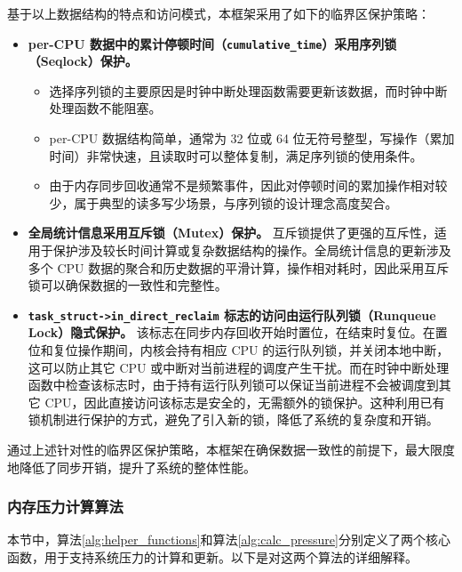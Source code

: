 基于以上数据结构的特点和访问模式，本框架采用了如下的临界区保护策略：

\begin{itemize}
    \item \textbf{per-CPU 数据中的累计停顿时间（\texttt{cumulative\_time}）采用序列锁（Seqlock）保护。}
    \begin{itemize}
        \item 选择序列锁的主要原因是时钟中断处理函数需要更新该数据，而时钟中断处理函数不能阻塞。
        \item per-CPU 数据结构简单，通常为 32 位或 64 位无符号整型，写操作（累加时间）非常快速，且读取时可以整体复制，满足序列锁的使用条件。
        \item 由于内存同步回收通常不是频繁事件，因此对停顿时间的累加操作相对较少，属于典型的读多写少场景，与序列锁的设计理念高度契合。
    \end{itemize}

    \item \textbf{全局统计信息采用互斥锁（Mutex）保护。} 互斥锁提供了更强的互斥性，适用于保护涉及较长时间计算或复杂数据结构的操作。全局统计信息的更新涉及多个 CPU 数据的聚合和历史数据的平滑计算，操作相对耗时，因此采用互斥锁可以确保数据的一致性和完整性。

    \item \textbf{\texttt{task\_struct->in\_direct\_reclaim} 标志的访问由运行队列锁（Runqueue Lock）隐式保护。}
    该标志在同步内存回收开始时置位，在结束时复位。在置位和复位操作期间，内核会持有相应 CPU 的运行队列锁，并关闭本地中断，这可以防止其它 CPU 或中断对当前进程的调度产生干扰。而在时钟中断处理函数中检查该标志时，由于持有运行队列锁可以保证当前进程不会被调度到其它 CPU，因此直接访问该标志是安全的，无需额外的锁保护。这种利用已有锁机制进行保护的方式，避免了引入新的锁，降低了系统的复杂度和开销。
\end{itemize}

通过上述针对性的临界区保护策略，本框架在确保数据一致性的前提下，最大限度地降低了同步开销，提升了系统的整体性能。


\subsubsection{内存压力计算算法}

本节中，算法\ref{alg:helper_functions}和算法\ref{alg:calc_pressure}分别定义了两个核心函数，用于支持系统压力的计算和更新。以下是对这两个算法的详细解释。

